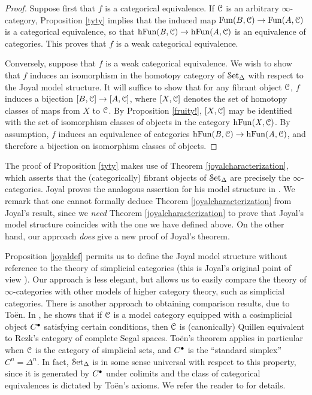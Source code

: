 \begin{proof}
Suppose first that $f$ is a categorical equivalence. If $\operatorname{\mathcal{C}}$ is an arbitrary $\infty$-category, Proposition \ref{tyty} implies that the induced map $\operatorname{Fun}(B,\operatorname{\mathcal{C}}) \rightarrow \operatorname{Fun}(A,\operatorname{\mathcal{C}})$ is a categorical equivalence, so that $\rm{h} \it{\operatorname{Fun}(B,\operatorname{\mathcal{C}})}\rightarrow \rm{h} \it{\operatorname{Fun}(A, \operatorname{\mathcal{C}})}$ is an equivalence of categories. This proves that $f$ is a weak categorical equivalence.

Conversely, suppose that $f$ is a weak categorical equivalence. We wish to show that $f$ induces an isomorphism in the homotopy category of $\operatorname{\mathcal{S}et_{\Delta}}$ with respect to the Joyal model structure. It will suffice to show that for any fibrant object $\operatorname{\mathcal{C}}$, $f$ induces a bijection $[B,\operatorname{\mathcal{C}}] \rightarrow [A,\operatorname{\mathcal{C}}]$, where $[X,\operatorname{\mathcal{C}}]$ denotes the set of homotopy classes of maps from $X$ to $\operatorname{\mathcal{C}}$. By Proposition \ref{fruity!}, $[X,\operatorname{\mathcal{C}}]$ may be identified with the set of isomorphism classes of objects in the category $\rm{h} \it{\operatorname{Fun}(X, \operatorname{\mathcal{C}})}$. By assumption, $f$ induces an equivalence of categories 
$\rm{h} \it{\operatorname{Fun}(B, \operatorname{\mathcal{C}})} \rightarrow \rm{h} \it{\operatorname{Fun}(A, \operatorname{\mathcal{C}})}$, and therefore a bijection on isomorphism classes of objects.
\end{proof}

\begin{remark}
The proof of Proposition \ref{tyty} makes use of Theorem \ref{joyalcharacterization}, which asserts that the (categorically) fibrant objects of $\operatorname{\mathcal{S}et_{\Delta}}$ are precisely the $\infty$-categories. Joyal proves the analogous assertion for his model structure in \cite{joyalnotpub}. We remark that one cannot formally deduce Theorem \ref{joyalcharacterization} from Joyal's result, since we {\em need} Theorem  \ref{joyalcharacterization} to prove that Joyal's model structure coincides with the one we have defined above. On the other hand, our approach {\em does} give a new proof of Joyal's theorem.
\end{remark}

\begin{remark}
Proposition \ref{joyaldef} permits us to define the Joyal model structure without reference to the theory of simplicial categories (this is Joyal's original point of view \cite{joyalnotpub}). Our approach 
is less elegant, but allows us to easily compare the theory of $\infty$-categories with other models of higher category theory, such as simplicial categories. There is another approach to obtaining comparison results, due to To\"{e}n. In \cite{toenchar}, he shows that if $\operatorname{\mathcal{C}}$ is a model category equipped with a cosimplicial object  $C^{\bullet}$ satisfying certain conditions, then $\operatorname{\mathcal{C}}$ is (canonically) Quillen equivalent to Rezk's category of complete Segal spaces.
To\"{e}n's theorem applies in particular when $\operatorname{\mathcal{C}}$ is the category of simplicial sets, and
$C^{\bullet}$ is the ``standard simplex'' $C^n = \Delta^n$.
In fact, $\operatorname{\mathcal{S}et_{\Delta}}$ is in some sense universal with respect to this property, since it is generated by $C^{\bullet}$ under colimits and the class of categorical equivalences is dictated by To\"{e}n's axioms. We refer the reader to \cite{toenchar} for details.
\end{remark}


